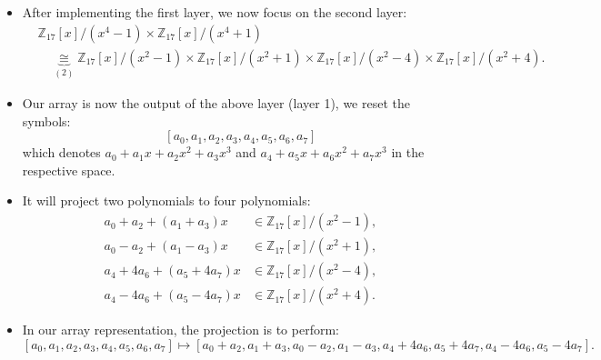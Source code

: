 \begin{frame}
    \begin{itemize}
        \item After implementing the first layer, we now focus on the second layer:
        \begin{align*}
            &\mathbb{Z}_{17}[x]/(x^{4}-1) \times \mathbb{Z}_{17}[x]/(x^{4}+1)\\
            &\quad\underbrace{\cong}_{(2)}\mathbb{Z}_{17}[x]/(x^{2}-1) \times \mathbb{Z}_{17}[x]/(x^{2}+1) \times \mathbb{Z}_{17}[x]/(x^{2}-4) \times \mathbb{Z}_{17}[x]/(x^{2}+4).
        \end{align*}
        \item Our array is now the output of the above layer (layer 1), we reset the symbols:
        \[ [a_{0}, a_{1}, a_{2}, a_{3}, a_{4}, a_{5}, a_{6}, a_{7}] \]
        which denotes \( a_{0} + a_{1}x + a_{2}x^{2} + a_{3}x^{3} \) and \(a_{4} + a_{5}x + a_{6}x^{2} + a_{7}x^{3}\) in the respective space.

        \item It will project two polynomials to four polynomials:
        \begin{align*}
            a_{0} + a_{2} + (a_{1} + a_{3})x &\in \mathbb{Z}_{17}[x]/(x^{2} - 1),\\
            a_{0} - a_{2} + (a_{1} - a_{3})x &\in \mathbb{Z}_{17}[x]/(x^{2} + 1),\\
            a_{4} + 4a_{6} + (a_{5} + 4a_{7})x &\in \mathbb{Z}_{17}[x]/(x^{2} - 4),\\
            a_{4} - 4a_{6} + (a_{5} - 4a_{7})x &\in \mathbb{Z}_{17}[x]/(x^{2} + 4).
        \end{align*}
        \item In our array representation, the projection is to perform:
        \[ 
        [a_{0}, a_{1}, a_{2}, a_{3}, a_{4}, a_{5}, a_{6}, a_{7}] \mapsto [a_{0} + a_{2}, a_{1} + a_{3}, a_{0} - a_{2}, a_{1} - a_{3}, a_{4} + 4a_{6}, a_{5} + 4a_{7}, a_{4} - 4a_{6}, a_{5} - 4a_{7}].
        \]

    \end{itemize}
\end{frame}


